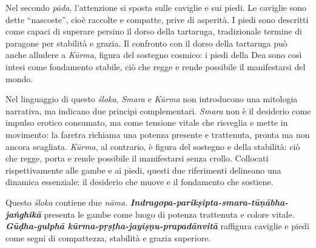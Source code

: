 Nel secondo \textit{pāda}, l’attenzione si sposta sulle caviglie e sui piedi. Le caviglie sono dette “nascoste”, cioè raccolte e compatte, prive di asperità. I piedi sono descritti come capaci di superare persino il dorso della tartaruga, tradizionale termine di paragone per stabilità e grazia. Il confronto con il dorso della tartaruga può anche alludere a \textit{Kūrma}, figura del sostegno cosmico: i piedi della Dea sono così intesi come fondamento stabile, ciò che regge e rende possibile il manifestarsi del mondo.

Nel linguaggio di questo \textit{śloka}, \textit{Smara} e \textit{Kūrma} non introducono una mitologia narrativa, ma indicano due principi complementari. \textit{Smara} non è il desiderio come impulso erotico consumato, ma come tensione vitale che risveglia e mette in movimento: la faretra richiama una potenza presente e trattenuta, pronta ma non ancora scagliata. \textit{Kūrma}, al contrario, è figura del sostegno e della stabilità: ciò che regge, porta e rende possibile il manifestarsi senza crollo. Collocati rispettivamente alle gambe e ai piedi, questi due riferimenti delineano una dinamica essenziale: il desiderio che muove e il fondamento che sostiene. 

Questo \textit{śloka} contiene due \textit{nāma}.  
\textbf{\textit{Indragopa-parikṣipta-smara-tūṇābha-jaṅghikā}} presenta le gambe come luogo di potenza trattenuta e colore vitale.  
\textbf{\textit{Gūḍha-gulphā kūrma-pṛṣṭha-jayiṣṇu-prapadānvitā}} raffigura caviglie e piedi come segni di compattezza, stabilità e grazia superiore.
